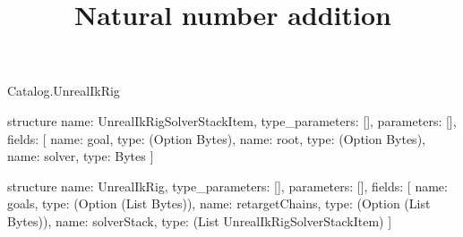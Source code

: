 \begin{lexlean}{Catalog.UnrealIkRig}
\title{Natural number addition}
\begin{semanticmodule}
structure{
  name: UnrealIkRigSolverStackItem,
  type_parameters: [],
  parameters: [],
  fields: [
    {name: goal, type: (Option Bytes)},
    {name: root, type: (Option Bytes)},
    {name: solver, type: Bytes}
  ]
}

structure{
  name: UnrealIkRig,
  type_parameters: [],
  parameters: [],
  fields: [
    {name: goals, type: (Option (List Bytes))},
    {name: retargetChains, type: (Option (List Bytes))},
    {name: solverStack, type: (List UnrealIkRigSolverStackItem)}
  ]
}
\end{semanticmodule}
\end{lexlean}
